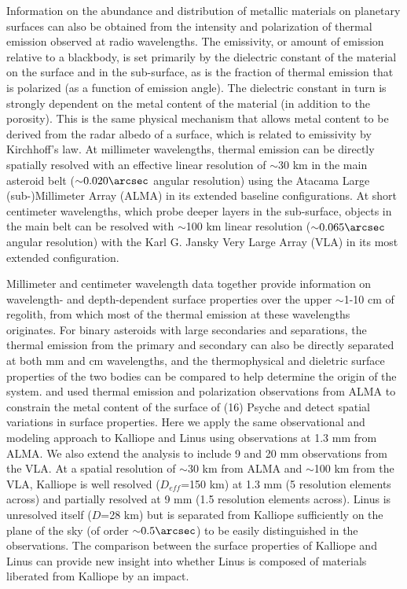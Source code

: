 \documentclass[]{aastex631}
\begin{document}
Information on the abundance and distribution of metallic materials on planetary surfaces can also be obtained from the intensity and polarization of thermal emission observed at radio wavelengths. The emissivity, or amount of emission relative to a blackbody, is set primarily by the dielectric constant of the material on the surface and in the sub-surface, as is the fraction of thermal emission that is polarized (as a function of emission angle). The dielectric constant in turn is strongly dependent on the metal content of the material (in addition to the porosity). This is the same physical mechanism that allows metal content to be derived from the radar albedo of a surface, which is related to emissivity by Kirchhoff's law. At millimeter wavelengths, thermal emission can be directly spatially resolved with an effective linear resolution of $\sim$30 km in the main asteroid belt (${\sim}0.020\arcsec$ angular resolution) using the Atacama Large (sub-)Millimeter Array (ALMA) in its extended baseline configurations. At short centimeter wavelengths, which probe deeper layers in the sub-surface, objects in the main belt can be resolved with $\sim$100 km linear resolution (${\sim}0.065\arcsec$ angular resolution) with the Karl G. Jansky Very Large Array (VLA) in its most extended configuration. 

Millimeter and centimeter wavelength data together provide information on wavelength- and depth-dependent surface properties over the upper $\sim$1-10 cm of regolith, from which most of the thermal emission at these wavelengths originates. For binary asteroids with large secondaries and separations, the thermal emission from the primary and secondary can also be directly separated at both mm and cm wavelengths, and the thermophysical and dieletric surface properties of the two bodies can be compared to help determine the origin of the system. 
\cite{dekleer2021} and \cite{cambioni2022} used thermal emission and polarization observations from ALMA to constrain the metal content of the surface of (16) Psyche and detect spatial variations in surface properties. Here we apply the same observational and modeling approach to Kalliope and Linus using observations at 1.3 mm from ALMA. We also extend the analysis to include 9 and 20 mm observations from the VLA. At a spatial resolution of $\sim$30 km from ALMA and $\sim$100 km from the VLA, Kalliope is well resolved ($D_{eff}$=150 km) at 1.3 mm (5 resolution elements across) and partially resolved at 9 mm (1.5 resolution elements across). Linus is unresolved itself ($D$=28 km) but is separated from Kalliope sufficiently on the plane of the sky (of order ${\sim}0.5\arcsec$) to be easily distinguished in the observations. The comparison between the surface properties of Kalliope and Linus can provide new insight into whether Linus is composed of materials liberated from Kalliope by an impact.
\end{document}
